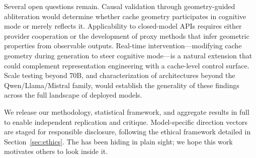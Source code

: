 Several open questions remain.
Causal validation through geometry-guided abliteration would determine whether cache geometry participates in cognitive mode or merely reflects it.
Applicability to closed-model APIs requires either provider cooperation or the development of proxy methods that infer geometric properties from observable outputs.
Real-time intervention---modifying cache geometry during generation to steer cognitive mode---is a natural extension that could complement representation engineering with a cache-level control surface.
Scale testing beyond 70B, and characterization of architectures beyond the Qwen/Llama/Mistral family, would establish the generality of these findings across the full landscape of deployed models.

We release our methodology, statistical framework, and aggregate results in full to enable independent replication and critique.
Model-specific direction vectors are staged for responsible disclosure, following the ethical framework detailed in Section~\ref{sec:ethics}.
The \kvcache has been hiding in plain sight; we hope this work motivates others to look inside it.